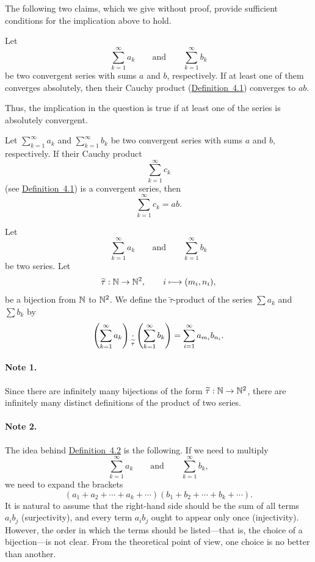 The following two claims, which we give without proof, provide sufficient conditions for the implication above to hold.

\begin{claim}\label{claim:4.1}
Let
\[
\sum_{k=1}^{\infty}a_k
\qquad\text{and}\qquad
\sum_{k=1}^{\infty}b_k
\]
be two convergent series with sums $a$ and $b$, respectively. If at least one of them converges absolutely, then their Cauchy product (\hyperref[def:4.1]{Definition~4.1}) converges to $ab$.
\end{claim}

Thus, the implication in the question is true if at least one of the series is absolutely convergent.

\begin{claim}\label{claim:4.2}
Let $\sum_{k=1}^{\infty}a_k$ and $\sum_{k=1}^{\infty}b_k$ be two convergent series with sums $a$ and $b$, respectively. If their Cauchy product
\[
\sum_{k=1}^{\infty}c_k
\]
(see \hyperref[def:4.1]{Definition~4.1}) is a convergent series, then
\[
\sum_{k=1}^{\infty}c_k=ab.
\]
\end{claim}

\begin{definition}\label{def:4.2}
Let
\[
\sum_{k=1}^{\infty}a_k
\qquad\text{and}\qquad
\sum_{k=1}^{\infty}b_k
\]
be two series. Let
\[
\widetilde\tau:\mathbb{N}\to\mathbb{N}^2,
\qquad
i\longmapsto(m_i,n_i),
\]
be a bijection from $\mathbb{N}$ to $\mathbb{N}^2$. We define the $\widetilde\tau$-product of the series $\sum a_k$ and $\sum b_k$ by
\[
\left(\sum_{k=1}^{\infty}a_k\right)
\mathbin{\underset{\widetilde\tau}{\cdot}}
\left(\sum_{k=1}^{\infty}b_k\right)
=
\sum_{i=1}^{\infty}a_{m_i}b_{n_i}.
\]
\end{definition}

\paragraph{Note 1.}
Since there are infinitely many bijections of the form $\widetilde\tau:\mathbb{N}\to\mathbb{N}^2$, there are infinitely many distinct definitions of the product of two series.

\paragraph{Note 2.}
The idea behind \hyperref[def:4.2]{Definition~4.2} is the following. If we need to multiply
\[
\sum_{k=1}^{\infty}a_k
\qquad\text{and}\qquad
\sum_{k=1}^{\infty}b_k,
\]
we need to expand the brackets
\[
(a_1+a_2+\cdots+a_k+\cdots)(b_1+b_2+\cdots+b_k+\cdots).
\]
It is natural to assume that the right-hand side should be the sum of all terms $a_i b_j$ (surjectivity), and every term $a_i b_j$ ought to appear only once (injectivity). However, the order in which the terms should be listed---that is, the choice of a bijection---is not clear. From the theoretical point of view, one choice is no better than another.


